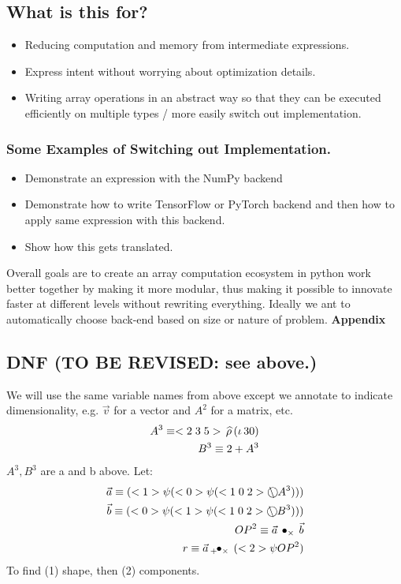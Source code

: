 \documentclass[a4paper,12pt]{article}
\begin{document}
\subsection{What is this for?}
\begin{itemize}
    \item Reducing computation and memory from intermediate expressions. 
    \item Express intent without worrying about optimization details.
    \item Writing array operations in an abstract way so that they can be executed efficiently on multiple types / more easily switch out implementation. 
\end{itemize}
\subsubsection{Some Examples of Switching out Implementation.}
\begin{itemize}
    \item Demonstrate an expression with the NumPy backend
    \item Demonstrate how to write TensorFlow or PyTorch backend and then how to apply same expression with this backend.
    \item Show how this gets translated.
\end{itemize}
Overall goals are to create an array computation ecosystem in python work better together by making it more modular, thus making it possible to innovate faster at different levels without rewriting everything. Ideally we ant to automatically choose back-end based on size or nature of problem. 
\newpage
{\bf Appendix}
\subsection{DNF (TO BE REVISED: see above.)}
We will use the same variable names from above except we annotate to indicate dimensionality, e.g. $\vec v$ for a vector and $A^2$ for a matrix, etc.
\begin{eqnarray}
A^3 \equiv <2\;3\;5>\,\widehat{\rho}\,(\iota\,30) \\
B^3 \equiv 2+A^3
\end{eqnarray}
$A^3,B^3$ are a and b above.
Let:
\begin{eqnarray}
\vec a \equiv (\vc1\psi( \vc0 \psi (\vccc102 \transpose A^3  ))) \\
\vec b \equiv (\vc0\psi( \vc1 \psi (\vccc102 \transpose B^3  )))\\
{OP}^2 \equiv \vec a \outerprod\times\vec b\\
r \equiv \vec a \innerprod+\times(\vc2 \psi {OP}^2)\\
\end{eqnarray}
To find (1) shape, then (2) components.
\end{document}
